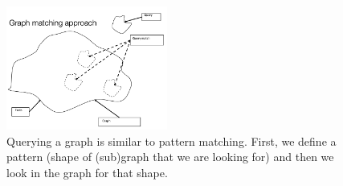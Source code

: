 \documentclass[10pt,a4paper]{article}
\begin{document}
\begin{figure}[h!]
 \hfill \includegraphics[width=150pt]{images/graph-query.png}\hspace*{\fill}
  \caption{Querying a graph is similar to pattern matching. First, we define a pattern (shape of (sub)graph that we are looking for) and then we look in the graph for that shape.}
\end{figure}  \\
\pagebreak
\end{document}
